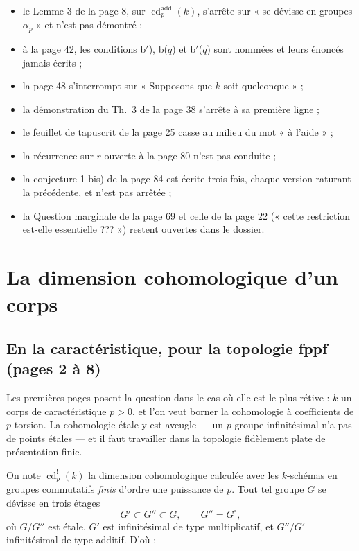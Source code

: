 \documentclass[11pt,a4paper]{article}
\begin{document}
\begin{itemize}
\item le Lemme 3 de la page 8, sur
$\operatorname{cd}^{\mathrm{add}}_p(k)$, s'arrête sur « se dévisse en groupes
$\alpha_p$ » et n'est pas démontré ;
\item à la page 42, les conditions b$'$), b($q$) et b$'$($q$) sont nommées et
leurs énoncés jamais écrits ;
\item la page 48 s'interrompt sur « Supposons que $k$ soit quelconque » ;
\item la démonstration du Th.\ 3 de la page 38 s'arrête à sa première ligne ;
\item le feuillet de tapuscrit de la page 25 casse au milieu du mot « à
l'aide » ;
\item la récurrence sur $r$ ouverte à la page 80 n'est pas conduite ;
\item la conjecture 1 bis) de la page 84 est écrite trois fois, chaque version
raturant la précédente, et n'est pas arrêtée ;
\item la Question marginale de la page 69 et celle de la page 22 (« cette
restriction est-elle essentielle ??? ») restent ouvertes dans le dossier.
\end{itemize}

\section*{La dimension cohomologique d'un corps}

\subsection*{En la caractéristique, pour la topologie fppf (pages 2 à 8)}

Les premières pages posent la question dans le cas où elle est le plus rétive :
$k$ un corps de caractéristique $p > 0$, et l'on veut borner la cohomologie à
coefficients de $p$-torsion. La cohomologie étale y est aveugle — un
$p$-groupe infinitésimal n'a pas de points étales — et il faut travailler dans
la topologie fidèlement plate de présentation finie.

On note $\operatorname{cd}^{!}_p(k)$ la dimension cohomologique calculée avec
les $k$-schémas en groupes commutatifs \emph{finis} d'ordre une puissance de
$p$. Tout tel groupe $G$ se dévisse en trois étages
\[
G' \subset G'' \subset G, \qquad G'' = G^{\circ},
\]
où $G/G''$ est étale, $G'$ est infinitésimal de type multiplicatif, et
$G''/G'$ infinitésimal de type additif. D'où :
\end{document}
